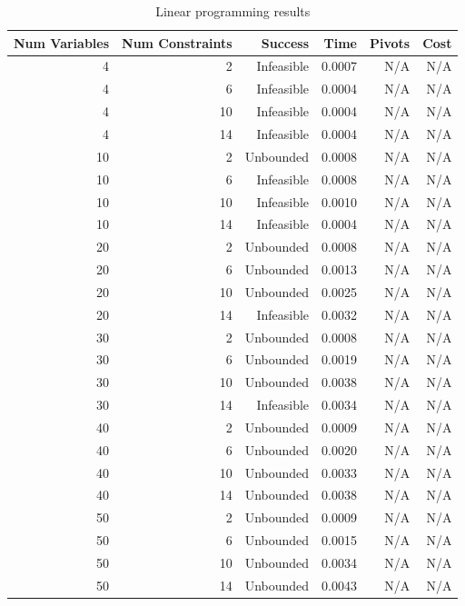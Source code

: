 \begin{table}[ht]
    \centering
    \begin{tabular}{rrrrrr}
        \toprule
        Num Variables & Num Constraints & Success & Time & Pivots & Cost \\
        \midrule
        4 & 2 & Infeasible & 0.0007 & N/A & N/A \\
		4 & 6 & Infeasible & 0.0004 & N/A & N/A \\
		4 & 10 & Infeasible & 0.0004 & N/A & N/A \\
		4 & 14 & Infeasible & 0.0004 & N/A & N/A \\
		10 & 2 & Unbounded & 0.0008 & N/A & N/A \\
		10 & 6 & Infeasible & 0.0008 & N/A & N/A \\
		10 & 10 & Infeasible & 0.0010 & N/A & N/A \\
		10 & 14 & Infeasible & 0.0004 & N/A & N/A \\
		20 & 2 & Unbounded & 0.0008 & N/A & N/A \\
		20 & 6 & Unbounded & 0.0013 & N/A & N/A \\
		20 & 10 & Unbounded & 0.0025 & N/A & N/A \\
		20 & 14 & Infeasible & 0.0032 & N/A & N/A \\
		30 & 2 & Unbounded & 0.0008 & N/A & N/A \\
		30 & 6 & Unbounded & 0.0019 & N/A & N/A \\
		30 & 10 & Unbounded & 0.0038 & N/A & N/A \\
		30 & 14 & Infeasible & 0.0034 & N/A & N/A \\
		40 & 2 & Unbounded & 0.0009 & N/A & N/A \\
		40 & 6 & Unbounded & 0.0020 & N/A & N/A \\
		40 & 10 & Unbounded & 0.0033 & N/A & N/A \\
		40 & 14 & Unbounded & 0.0038 & N/A & N/A \\
		50 & 2 & Unbounded & 0.0009 & N/A & N/A \\
		50 & 6 & Unbounded & 0.0015 & N/A & N/A \\
		50 & 10 & Unbounded & 0.0034 & N/A & N/A \\
		50 & 14 & Unbounded & 0.0043 & N/A & N/A \\
        \bottomrule
    \end{tabular}
    \caption{Linear programming results}
    \label{tab:lp-results}
\end{table}